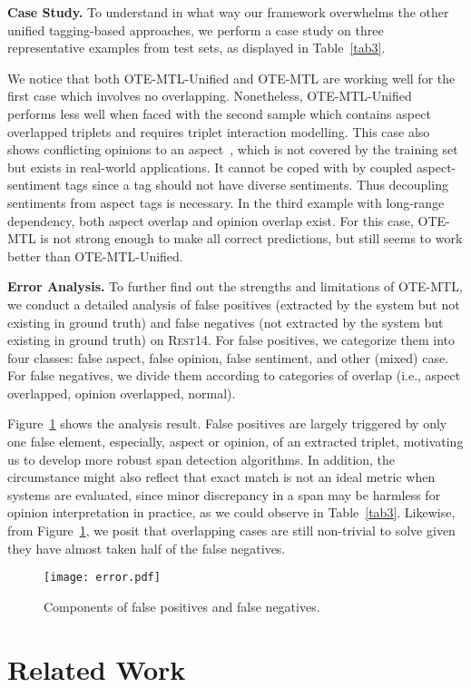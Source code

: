 \documentclass[11pt,a4paper]{article}
\begin{document}
\noindent \textbf{Case Study.} To understand in what way our framework overwhelms the other unified tagging-based approaches, we perform a case study on three representative examples from test sets, as displayed in Table~\ref{tab3}. 

We notice that both OTE-MTL-Unified and OTE-MTL are working well for the first case which involves no overlapping. Nonetheless, OTE-MTL-Unified performs less well when faced with the second sample which contains aspect overlapped triplets and requires triplet interaction modelling. This case also shows conflicting opinions to an aspect~\cite{tan-etal-2019-recognizing}, which is not covered by the training set but exists in real-world applications. It cannot be coped with by coupled aspect-sentiment tags since a tag should not have diverse sentiments. Thus decoupling sentiments from aspect tags is necessary. In the third example with long-range dependency, both aspect overlap and opinion overlap exist. For this case, OTE-MTL is not strong enough to make all correct predictions, but still seems to work better than OTE-MTL-Unified.

\noindent \textbf{Error Analysis.} To further find out the strengths and limitations of OTE-MTL, we conduct a detailed analysis of false positives (extracted by the system but not existing in ground truth) and false negatives (not extracted by the system but existing in ground truth) on \textsc{Rest14}. For false positives, we categorize them into four classes: false aspect, false opinion, false sentiment, and other (mixed) case. For false negatives, we divide them according to categories of overlap (i.e., aspect overlapped, opinion overlapped, normal). 

Figure~\ref{fig4} shows the analysis result. False positives are largely triggered by only one false element, especially, aspect or opinion, of an extracted triplet, motivating us to develop more robust span detection algorithms. In addition, the circumstance might also reflect that exact match is not an ideal metric when systems are evaluated, since minor discrepancy in a span may be harmless for opinion interpretation in practice, as we could observe in Table~\ref{tab3}. Likewise, from Figure~\ref{fig4}, we posit that overlapping cases are still non-trivial to solve given they have almost taken half of the false negatives.

\begin{figure}[ht]
    \centering\texttt{[image: error.pdf]}
    \caption{Components of false positives and false negatives.}
    \label{fig4}
\end{figure} \section{Related Work}
\end{document}
